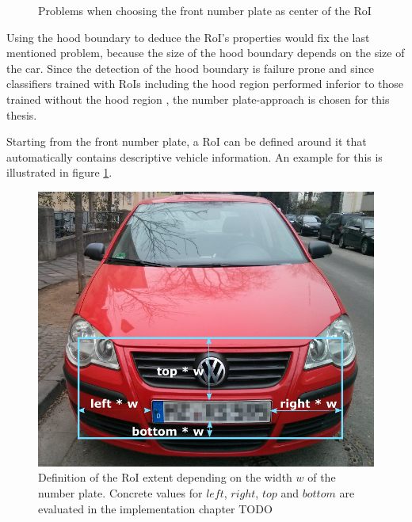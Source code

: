 \begin{figure}[btph]
        \myfloatalign
         \quad
         \quad
        \caption[Problems when choosing the front number plate as center of the RoI]{Problems when choosing the front number plate as center of the RoI}
\end{figure}
Using the hood boundary to deduce the RoI's properties would fix the last mentioned problem, because the size of the hood boundary depends on the size of the car. Since the detection of the hood boundary is failure prone and since classifiers trained with RoIs including the hood region performed inferior to those trained without the hood region \citep{hsieh2014symmetrical}, the number plate-approach is chosen for this thesis.

Starting from the front number plate, a RoI can be defined around it that automatically contains descriptive vehicle information. An example for this is illustrated in figure \ref{fig:roiDimensions}.

\begin{figure}[btph]
  \centering
        \includegraphics[width=.35\linewidth]{gfx/roi_dimensions}
        \caption{Definition of the RoI extent depending on the width $w$ of the number plate. Concrete values for $left$, $right$, $top$ and $bottom$ are evaluated in the implementation chapter TODO}
        \label{fig:roiDimensions}
\end{figure}


